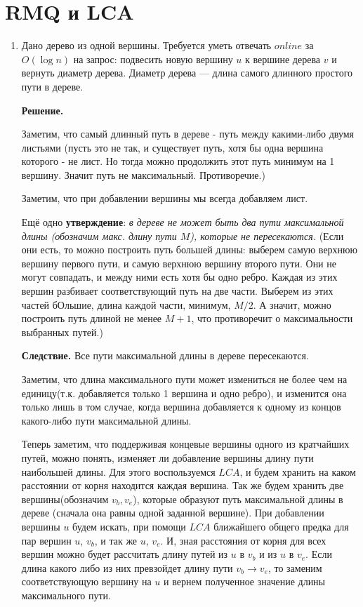 \section{RMQ и LCA}
\begin{enumerate}
	\item Дано дерево из одной вершины. Требуется уметь отвечать $online$ за $O(\log n)$ на
	запрос: подвесить новую вершину $u$ к вершине дерева $v$ и вернуть диаметр дерева. Диаметр
	дерева — длина самого длинного простого пути в дереве. 
	
	\textbf{Решение.} 
	
	Заметим, что самый длинный путь в дереве - путь между какими-либо двумя листьями (пусть это 
	не так, и существует путь, хотя бы одна вершина которого - не лист. Но тогда можно 
	продолжить этот путь минимум на 1 вершину. Значит путь не максимальный. Противоречие.)
	
	Заметим, что при добавлении вершины мы всегда добавляем лист. 
	
	Ещё одно \textbf{ утверждение}: \textit{в дереве не может быть два пути максимальной длины 
	(обозначим макс. длину пути $M$), которые не пересекаются.} (Если они есть, то можно 
	построить путь большей длины: выберем самую верхнюю вершину первого пути, и самую верхнюю 
	вершину второго пути. Они не могут совпадать, и между ними есть хотя бы одно ребро. Каждая 
	из этих вершин разбивает соответствующий путь на две части. Выберем из этих частей бОльшие, 
	длина каждой части, минимум, $M / 2$. А значит, можно построить путь длиной не менее $M + 
	1$, что противоречит о максимальности выбранных путей.)
	
	\textbf{Следствие.} Все пути максимальной длины в дереве пересекаются. 
	
	Заметим, что длина максимального пути может измениться не более чем на единицу(т.к. 
	добавляется только 1 вершина и одно ребро), и изменится она только лишь в том случае, когда 
	вершина добавляется к одному из концов какого-либо пути максимальной длины.
	
	Теперь заметим, что поддерживая концевые вершины одного из кратчайших путей, можно понять, 
	изменяет ли добавление вершины длину пути наибольшей длины. Для этого воспользуемся $LCA$, 
	и будем хранить на каком расстоянии от корня находится каждая вершина. Так же будем хранить 
	две вершины(обозначим $v_b, v_e$), которые образуют путь максимальной длины в дереве 
	(сначала она равны одной заданной вершине). При добавлении вершины $u$ будем искать, при 
	помощи $LCA$ ближайшего общего предка для пар вершин $u$, $v_b$, и так же $u$, $v_e$. И, 
	зная расстояния от корня для всех вершин можно будет рассчитать длину путей из $u$ в $v_b$ 
	и из $u$ в $v_e$. Если длина какого либо из них превзойдет длину пути $v_b \to v_e$, то 
	заменим соответствующую вершину на $u$ и вернем полученное значение длины максимального 
	пути.
	

\end{enumerate}
